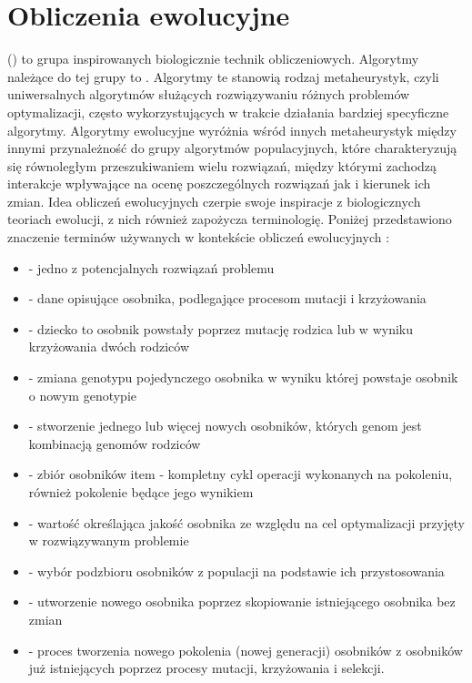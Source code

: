 \section{Obliczenia ewolucyjne}

 () to grupa inspirowanych biologicznie technik obliczeniowych. Algorytmy należące do tej grupy to . Algorytmy te stanowią rodzaj metaheurystyk, czyli uniwersalnych algorytmów służących rozwiązywaniu różnych problemów optymalizacji, często wykorzystujących w trakcie działania bardziej specyficzne algorytmy. Algorytmy ewolucyjne wyróżnia wśród innych metaheurystyk między innymi przynależność do grupy algorytmów populacyjnych, które charakteryzują się równoległym przeszukiwaniem wielu rozwiązań, między którymi zachodzą interakcje wpływające na ocenę poszczególnych rozwiązań jak i kierunek ich zmian. Idea obliczeń ewolucyjnych czerpie swoje inspiracje z biologicznych teoriach ewolucji, z nich również zapożycza terminologię. Poniżej przedstawiono znaczenie terminów używanych w kontekście obliczeń ewolucyjnych \cite{Luke2009Metaheuristics}:

\begin{itemize}
	\item {} - jedno z potencjalnych rozwiązań problemu
	\item {} - dane opisujące osobnika, podlegające procesom mutacji i krzyżowania
	\item {} - dziecko to osobnik powstały poprzez mutację rodzica lub w wyniku krzyżowania dwóch rodziców
	\item {} - zmiana genotypu pojedynczego osobnika w wyniku której powstaje osobnik o nowym genotypie
	\item {} - stworzenie jednego lub więcej nowych osobników, których genom jest kombinacją genomów rodziców
	\item {} - zbiór osobników
	item  - kompletny cykl operacji wykonanych na pokoleniu, również pokolenie będące jego wynikiem
	\item {} - wartość określająca jakość osobnika ze względu na cel optymalizacji przyjęty w rozwiązywanym problemie
	\item {} - wybór podzbioru osobników z populacji na podstawie ich przystosowania
	\item {} - utworzenie nowego osobnika poprzez skopiowanie istniejącego osobnika bez zmian
	\item {} - proces tworzenia nowego pokolenia (nowej generacji) osobników z osobników już istniejących poprzez procesy mutacji, krzyżowania i selekcji.
\end{itemize}

